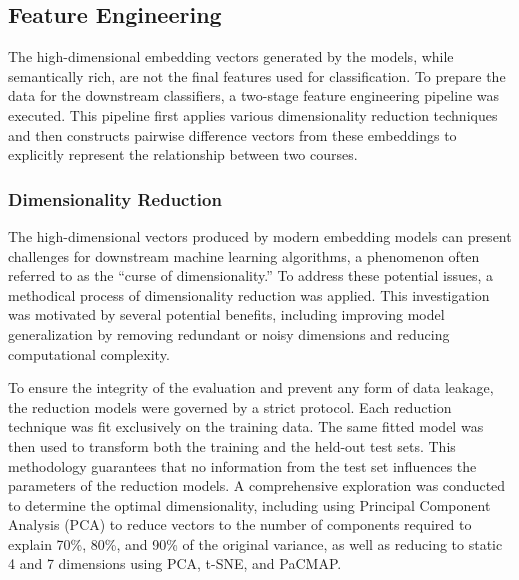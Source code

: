 \subsection{Feature Engineering}\label{ch:3.2.3}
The high-dimensional embedding vectors generated by the models, while semantically rich, are not the final features used for classification. To prepare the data for the downstream classifiers, a two-stage feature engineering pipeline was executed. This pipeline first applies various dimensionality reduction techniques and then constructs pairwise difference vectors from these embeddings to explicitly represent the relationship between two courses.

\subsubsection{Dimensionality Reduction}\label{ch:3.2.3.1}
The high-dimensional vectors produced by modern embedding models can present challenges for downstream machine learning algorithms, a phenomenon often referred to as the ``curse of dimensionality.'' To address these potential issues, a methodical process of dimensionality reduction was applied. This investigation was motivated by several potential benefits, including improving model generalization by removing redundant or noisy dimensions and reducing computational complexity.

To ensure the integrity of the evaluation and prevent any form of data leakage, the reduction models were governed by a strict protocol. Each reduction technique was fit exclusively on the training data. The same fitted model was then used to transform both the training and the held-out test sets. This methodology guarantees that no information from the test set influences the parameters of the reduction models. A comprehensive exploration was conducted to determine the optimal dimensionality, including using Principal Component Analysis (PCA) to reduce vectors to the number of components required to explain 70\%, 80\%, and 90\% of the original variance, as well as reducing to static 4 and 7 dimensions using PCA, t-SNE, and PaCMAP.

